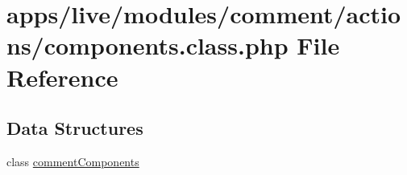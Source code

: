 \hypertarget{live_2modules_2comment_2actions_2components_8class_8php}{\section{apps/live/modules/comment/actions/components.class.\-php File Reference}
\label{live_2modules_2comment_2actions_2components_8class_8php}
}
\subsection*{Data Structures}
\begin{DoxyCompactItemize}
\item 
class \hyperlink{classcomment_components}{comment\-Components}
\end{DoxyCompactItemize}
